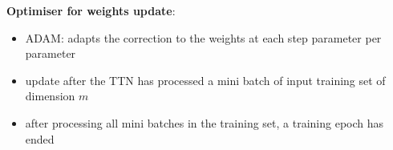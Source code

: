 \documentclass[xcolor=table,8pt]{beamer}
\begin{document}
\begin{frame}[t]
        \medskip
        \textbf{Optimiser for weights update}:
        \begin{itemize}
            \item \alert{ADAM}: adapts the correction to the weights at each step parameter per parameter
            \item update after the TTN has processed a \alert{mini batch} of input training set of dimension \( m \)
            \item after processing all mini batches in the training set, a \alert{training epoch} has ended
        \end{itemize}
    \end{frame}
    
    
    
\end{document}
